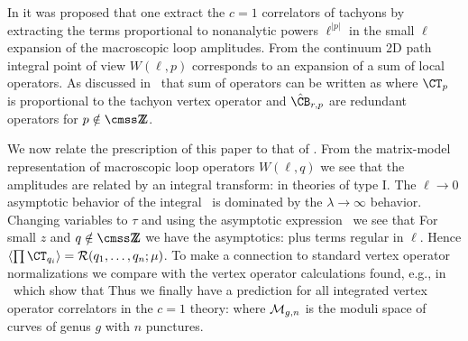 In 
it was proposed that one extract the $c=1$ correlators of tachyons 
by extracting the terms proportional to nonanalytic powers 
$\ell^{|p|}$ in the small $\ell$ expansion of the macroscopic loop amplitudes. 
From the continuum 2D path integral point of view $W(\ell,p)$ 
corresponds to an expansion of a sum of local operators. 
As discussed in \lpsflds\ that sum of operators can be written as 
\eqn{}
where $\CT_p$ is proportional to the tachyon vertex operator and 
$\hat\CB_{r,p}$ are redundant operators for $p\notin \IZ$. 
 
 
We now relate the prescription of this paper to that of 
. 
From the matrix-model representation of macroscopic loop
operators $W(\ell,q)$ we see 
that the amplitudes are related by an integral transform:
\eqn{}
in theories of type I.%
The $\ell\to 0$ asymptotic behavior of the integral \mclp\  is
dominated by the $\lambda\to\infty$ behavior. Changing variables to
$\tau$  and using the asymptotic expression \ we see that
\eqn{}
For small $z$ and $q\notin\IZ$ we have the asymptotics:
\eqn{}
plus terms regular in $\ell$. Hence
$\langle \prod \CT_{q_i}\rangle=\CR(q_1,\dots, q_n;\mu)$. 
To make a connection to standard vertex operator normalizations we
compare with the vertex operator calculations found, e.g., in 
\kdf\ which show that
\eqn{}
Thus we finally have a prediction for all 
integrated vertex operator correlators
in the $c=1$ theory:
\eqn{}
where ${\cal M}_{g,n}$ is the moduli space of curves of genus $g$ with 
$n$ punctures.
 
